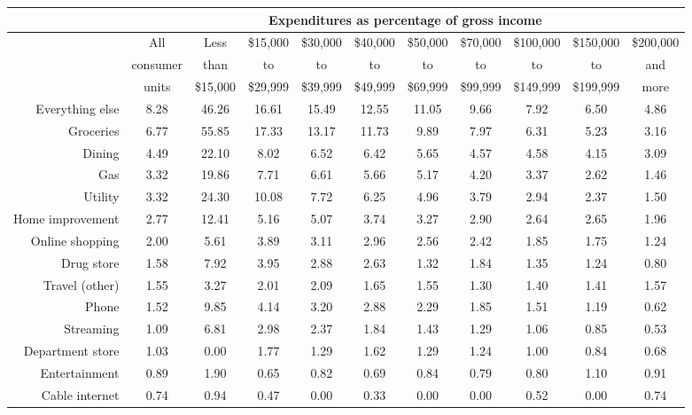 \begin{table}[t!bh]
    \centering
    \begin{tabular}{ r c c c c c c c c c c} 
        \hline
          & \multicolumn{10}{c}{Expenditures as percentage of gross income} \\ 
         \hline
          & All & Less & \$15,000  & \$30,000 & \$40,000  & \$50,000  & \$70,000 & \$100,000  & \$150,000 & \$200,000 \\
          & consumer  &  than  & to  & to  & to & to & to & to & to &  and  \\
          & units & \$15,000 & \$29,999 & \$39,999 & \$49,999 & \$69,999 & \$99,999 & \$149,999 & \$199,999 &  more \\
        \hline
        Everything else	& 8.28 & 46.26 & 16.61 & 15.49 & 12.55 & 11.05 & 9.66 &	7.92 & 6.50 & 4.86 \\
        Groceries & 6.77 &	55.85 &	17.33 &	13.17 &	11.73 &	9.89 &	7.97 &	6.31 &	5.23 &	3.16 \\
        Dining &  4.49 &	22.10 &	8.02 &	6.52 &	6.42 &	5.65 &	4.57 &	4.58 &	4.15 &	3.09 \\
        Gas	&  3.32 &	19.86 &	7.71 &	6.61 &	5.66 &	5.17 &	4.20 &	3.37 &	2.62 &	1.46 \\
        Utility	& 3.32 &	24.30 &	10.08 &	7.72 &	6.25 &	4.96 &	3.79 &	2.94 &	2.37 &	1.50 \\
        Home improvement & 2.77 &	12.41 &	5.16 &	5.07 &	3.74 &	3.27 &	2.90 &	2.64 &	2.65 &	1.96 \\
        Online shopping	& 2.00 &	5.61 &	3.89 &	3.11 &	2.96 &	2.56 &	2.42 &	1.85 &	1.75 &	1.24 \\
        Drug store	& 1.58 &	7.92 &	3.95 &	2.88 &	2.63 &	1.32 &	1.84 &	1.35 &	1.24 &	0.80 \\
        Travel (other) & 1.55 &	3.27 &	2.01 &	2.09 &	1.65 &	1.55 &	1.30 &	1.40 &	1.41 &	1.57 \\
        Phone & 1.52 &	9.85 &	4.14 &	3.20 &	2.88 &	2.29 &	1.85 &	1.51 &	1.19 &	0.62 \\
        Streaming & 1.09 &	6.81 &	2.98 &	2.37 &	1.84 &	1.43 &	1.29 &	1.06 &	0.85 &	0.53 \\
        Department store & 1.03 &	0.00 &	1.77 &	1.29 &	1.62 &	1.29 &	1.24 &	1.00 &	0.84 &	0.68 \\
        Entertainment &  0.89 &	1.90 &	0.65 &	0.82 &	0.69 &	0.84 &	0.79 &	0.80 &	1.10 &	0.91 \\
        Cable internet & 0.74 &	0.94 &	0.47 &	0.00 &	0.33 &	0.00 &	0.00 &	0.52 &	0.00 &	0.74 \\

\end{tabular}
\end{table}
